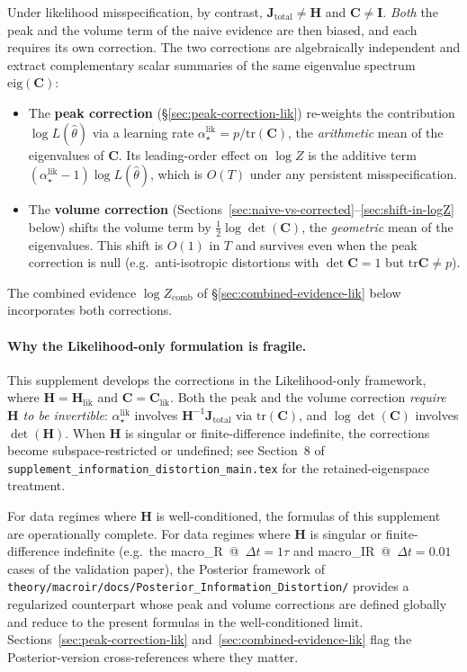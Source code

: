 \documentclass[11pt]{article}
\begin{document}
Under likelihood misspecification, by contrast,
$\mathbf J_{\mathrm{total}} \neq \mathbf H$ and $\mathbf C \neq \mathbf I$.
\emph{Both} the peak and the volume term of the naive evidence are then
biased, and each requires its own correction. The two corrections are
algebraically independent and extract complementary scalar summaries of the
same eigenvalue spectrum $\mathrm{eig}(\mathbf C)$:
\begin{itemize}
\item The \textbf{peak correction} (\S\ref{sec:peak-correction-lik}) re-weights
the contribution $\log L(\hat\theta)$ via a learning rate
$\alpha_\star^{\mathrm{lik}} = p/\mathrm{tr}(\mathbf C)$, the \emph{arithmetic}
mean of the eigenvalues of $\mathbf C$. Its leading-order effect on $\log Z$
is the additive term $(\alpha_\star^{\mathrm{lik}}-1)\log L(\hat\theta)$,
which is $O(T)$ under any persistent misspecification.
\item The \textbf{volume correction} (Sections~\ref{sec:naive-vs-corrected}--\ref{sec:shift-in-logZ}
below) shifts the volume term by $\tfrac{1}{2}\log\det(\mathbf C)$, the
\emph{geometric} mean of the eigenvalues. This shift is $O(1)$ in $T$ and
survives even when the peak correction is null (e.g.\ anti-isotropic
distortions with $\det\mathbf C = 1$ but $\mathrm{tr}\mathbf C \neq p$).
\end{itemize}
The combined evidence $\log Z_{\mathrm{comb}}$ of
\S\ref{sec:combined-evidence-lik} below incorporates both corrections.

\paragraph{Why the Likelihood-only formulation is fragile.}
This supplement develops the corrections in the Likelihood-only framework,
where $\mathbf H = \mathbf H_{\mathrm{lik}}$ and $\mathbf C = \mathbf C_{\mathrm{lik}}$.
Both the peak and the volume correction \emph{require $\mathbf H$ to be
invertible}: $\alpha_\star^{\mathrm{lik}}$ involves $\mathbf H^{-1}\mathbf J_{\mathrm{total}}$
via $\mathrm{tr}(\mathbf C)$, and $\log\det(\mathbf C)$ involves
$\det(\mathbf H)$. When $\mathbf H$ is singular or finite-difference
indefinite, the corrections become subspace-restricted or undefined; see
Section~8 of \texttt{supplement\_information\_distortion\_main.tex} for the
retained-eigenspace treatment.

For data regimes where $\mathbf H$ is well-conditioned, the formulas of
this supplement are operationally complete. For data regimes where
$\mathbf H$ is singular or finite-difference indefinite (e.g.\ the
macro\_R~@~$\Delta t = 1\tau$ and macro\_IR~@~$\Delta t = 0.01$ cases of
the validation paper), the Posterior framework of
\texttt{theory/macroir/docs/Posterior\_Information\_Distortion/} provides a
regularized counterpart whose peak and volume corrections are defined
globally and reduce to the present formulas in the well-conditioned limit.
Sections~\ref{sec:peak-correction-lik} and~\ref{sec:combined-evidence-lik}
flag the Posterior-version cross-references where they matter.
\end{document}
